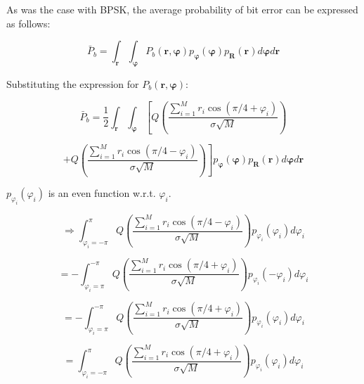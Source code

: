 \documentclass[fleqn]{article}
\begin{document}
\begin{enumerate}
		As was the case with BPSK, the average probability of bit error can be expressed as follows:
		
		\begin{equation*}
			\bar{P}_b = \int_{\mathbf{r}}{\int_{\boldsymbol{\varphi}}{P_b(\mathbf{r},\boldsymbol{\varphi})p_{\boldsymbol{\varphi}}(\boldsymbol{\varphi})p_{\mathbf{R}}(\mathbf{r})d\boldsymbol{\varphi}}d\mathbf{r}}
		\end{equation*}
		
		Substituting the expression for $P_b(\mathbf{r},\boldsymbol{\varphi})$:
		
		\begin{equation*}
			\bar{P}_b = \frac{1}{2}\int_{\mathbf{r}}{\int_{\boldsymbol{\varphi}}{\left[Q\left(\frac{\sum_{i=1}^{M}{r_i\cos(\pi/4 + \varphi_i)}}{\sigma\sqrt{M}}\right)\right.}}
		\end{equation*}
		
		\begin{equation*}
			{{\left. + Q\left(\frac{\sum_{i=1}^{M}{r_i\cos(\pi/4 - \varphi_i)}}{\sigma\sqrt{M}}\right)\right]p_{\boldsymbol{\varphi}}(\boldsymbol{\varphi})p_{\mathbf{R}}(\mathbf{r})d\boldsymbol{\varphi}}d\mathbf{r}}
		\end{equation*}
		
		$p_{\varphi_i}(\varphi_i)$ is an even function w.r.t. $\varphi_i$.
		
		\begin{equation*}
			\Rightarrow \int_{\varphi_i=-\pi}^{\pi}{Q\left(\frac{\sum_{i=1}^{M}{r_i\cos(\pi/4 - \varphi_i)}}{\sigma\sqrt{M}}\right)p_{\varphi_i}(\varphi_i)d\varphi_i}
		\end{equation*}
		
		\begin{equation*}
			= - \int_{\varphi_i=\pi}^{-\pi}{Q\left(\frac{\sum_{i=1}^{M}{r_i\cos(\pi/4 + \varphi_i)}}{\sigma\sqrt{M}}\right)p_{\varphi_i}(-\varphi_i)d\varphi_i}
		\end{equation*}
		
		\begin{equation*}
			= - \int_{\varphi_i=\pi}^{-\pi}{Q\left(\frac{\sum_{i=1}^{M}{r_i\cos(\pi/4 + \varphi_i)}}{\sigma\sqrt{M}}\right)p_{\varphi_i}(\varphi_i)d\varphi_i}
		\end{equation*}
		
		\begin{equation*}
			= \int_{\varphi_i=-\pi}^{\pi}{Q\left(\frac{\sum_{i=1}^{M}{r_i\cos(\pi/4 + \varphi_i)}}{\sigma\sqrt{M}}\right)p_{\varphi_i}(\varphi_i)d\varphi_i}
		\end{equation*}
		

\end{enumerate}
\end{document}
